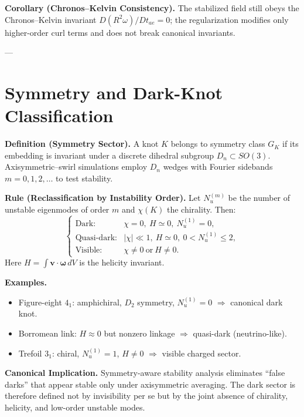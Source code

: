 \documentclass[10pt,reprint,aps,onecolumn,nofootinbib]{revtex4-2}
\begin{document}
    \textbf{Corollary (Chronos–Kelvin Consistency).}
    The stabilized field still obeys the Chronos–Kelvin invariant
    \(\displaystyle D(R^2\omega)/Dt_{\!ae}=0\);
    the regularization modifies only higher-order curl terms and does not break canonical invariants.

    ---

    \section{Symmetry and Dark-Knot Classification}
    \label{sec:dark-knot}

    \textbf{Definition (Symmetry Sector).}
    A knot \(K\) belongs to symmetry class $G_K$
    if its embedding is invariant under a discrete dihedral subgroup
    $D_n\!\subset\!SO(3)$.
    Axisymmetric–swirl simulations employ
    $D_n$ wedges with Fourier sidebands $m\!=\!0,1,2,\dots$
    to test stability.

    \textbf{Rule (Reclassification by Instability Order).}
    Let \(N_u^{(m)}\) be the number of unstable eigenmodes of order \(m\)
    and \(\chi(K)\) the chirality.
    Then:
    \[
        \begin{cases}
            \text{Dark:} & \chi=0,\ H\simeq0,\ N_u^{(1)}=0,\\[3pt]
            \text{Quasi-dark:} & |\chi|\!\ll\!1,\ H\simeq0,\ 0<N_u^{(1)}\!\le\!2,\\[3pt]
            \text{Visible:} & \chi\neq0\ \text{or}\ H\neq0.
        \end{cases}
    \]
    Here \(H=\int\mathbf{v}\!\cdot\!\boldsymbol{\omega}\,dV\) is the helicity invariant.

    \textbf{Examples.}
    \begin{itemize}
        \item Figure-eight \(4_1\): amphichiral, $D_2$ symmetry, $N_u^{(1)}=0$
        $\Rightarrow$ canonical dark knot.
        \item Borromean link: $H\approx0$ but nonzero linkage
        $\Rightarrow$ quasi-dark (neutrino-like).
        \item Trefoil \(3_1\): chiral, $N_u^{(1)}=1$, $H\!\neq\!0$
        $\Rightarrow$ visible charged sector.
    \end{itemize}

    \textbf{Canonical Implication.}
    Symmetry-aware stability analysis eliminates “false darks” that appear stable only under
    axisymmetric averaging.  The dark sector is therefore defined not by invisibility per se
    but by the joint absence of chirality, helicity, and low-order unstable modes.
\end{document}
